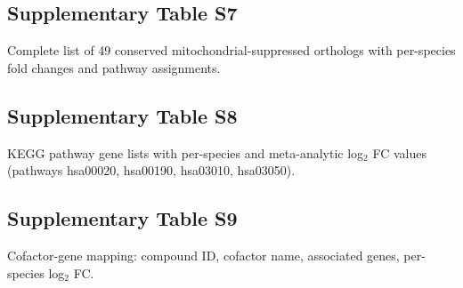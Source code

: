 \documentclass[11pt,a4paper]{article}
\begin{document}
\subsection*{Supplementary Table S7}
\label{sec:supp:table_s7}

Complete list of 49 conserved mitochondrial-suppressed orthologs with per-species 
fold changes and pathway assignments.

\subsection*{Supplementary Table S8}
\label{sec:supp:table_s8}

KEGG pathway gene lists with per-species and meta-analytic log$_2$ FC values 
(pathways hsa00020, hsa00190, hsa03010, hsa03050).

\subsection*{Supplementary Table S9}
\label{sec:supp:table_s9}

Cofactor-gene mapping: compound ID, cofactor name, associated genes, per-species 
log$_2$ FC.
\end{document}

